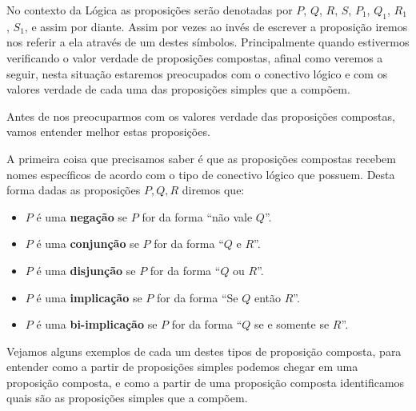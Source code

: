  No contexto da Lógica as proposições serão denotadas por $P$, $Q$, $R$, $S$, $P_1$, $Q_1$, $R_1$, $S_1$, e assim por diante. Assim por vezes ao invés de escrever a proposição iremos nos referir a ela através de um destes símbolos. Principalmente quando estivermos verificando o valor verdade de proposições compostas, afinal como veremos a seguir, nesta situação estaremos preocupados com o conectivo lógico e com os valores verdade de cada uma das proposições simples que a compõem.

 Antes de nos preocuparmos com os valores verdade das proposições compostas, vamos entender melhor estas proposições.

 A primeira coisa que precisamos saber é que as proposições compostas recebem nomes específicos de acordo com o tipo de conectivo lógico que possuem. Desta forma dadas as proposições $P, Q, R$ diremos que:

 \begin{itemize}
  \item $P$ é uma \textbf{negação} se $P$ for da forma ``não vale $Q$''.
  \item $P$ é uma \textbf{conjunção} se $P$ for da forma ``$Q$ e $R$''.
  \item $P$ é uma \textbf{disjunção} se $P$ for da forma ``$Q$ ou $R$''.
  \item $P$ é uma \textbf{implicação} se $P$ for da forma ``Se $Q$ então $R$''.
  \item $P$ é uma \textbf{bi-implicação} se $P$ for da forma ``$Q$ se e somente se $R$''.
 \end{itemize}

 Vejamos alguns exemplos de cada um destes tipos de proposição composta, para entender como a partir de proposições simples podemos chegar em uma proposição composta, e como a partir de uma proposição composta identificamos quais são as proposições simples que a compõem.

